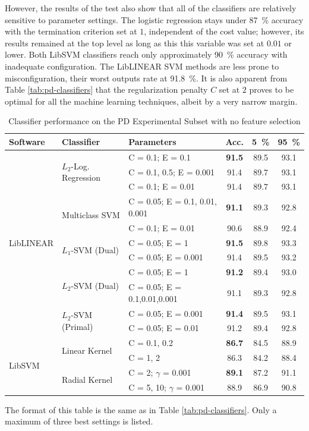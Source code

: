 \documentclass[12pt,notitlepage,a4paper]{report}
\begin{document}
However, the results of the test also show that all of the classifiers are relatively sensitive to parameter settings. The logistic regression stays under 87~\% accuracy with the termination criterion set at $1$, independent of the cost value; however, its results remained at the top level as long as this this variable was set at $0.01$ or lower. Both LibSVM classifiers reach only approximately 90~\% accuracy with inadequate configuration. The LibLINEAR SVM methods are less prone to misconfiguration, their worst outputs rate at 91.8~\%. It is also apparent from Table \ref{tab:pd-classifiers} that the regularization penalty $C$ set at $2$ proves to be optimal for all the machine learning techniques, albeit by a very narrow margin.

\begin{table}[htpb]
\caption{Classifier performance on the PD Experimental Subset with no feature selection}\label{tab:pd-allfeat}\footnotesize
\begin{center}
\shorthandoff{-}
\begin{tabular}{|l|l|l|c|c|c|}\hline
\bf Software & \bf Classifier & \bf Parameters & \bf Acc. & \bf 5~\% & \bf 95~\% \\\hline
\multirow{11}{*}{LibLINEAR} & \multirow{3}{*}{$L_2$-Log. Regression} & C = 0.1; E = 0.1 & \bf 91.5 & 89.5 & 93.1 \\
 & & C = 0.1, 0.5; E = 0.001 & 91.4 & 89.7 & 93.1 \\
 & & C = 0.1; E = 0.01 & 91.4 & 89.7 & 93.1 \\\cline{2-6}
 & \multirow{2}{*}{Multiclass SVM} & C = 0.05; E = 0.1, 0.01, 0.001 & \bf 91.1 & 89.3 & 92.8 \\
 &  & C = 0.1; E = 0.01 & 90.6 & 88.9 & 92.4 \\\cline{2-6}
 & \multirow{2}{*}{$L_1$-SVM (Dual)} & C = 0.05; E = 1 & \bf 91.5 & 89.8 & 93.3 \\
 & & C = 0.05; E = 0.001 & 91.4 & 89.5 & 93.2 \\ \cline{2-6}
 & \multirow{2}{*}{$L_2$-SVM (Dual)} & C = 0.05; E = 1 & \bf 91.2 & 89.4 & 93.0 \\
 &  & C = 0.05; E = 0.1,0.01,0.001 & 91.1 & 89.3 & 92.8 \\\cline{2-6}
 & \multirow{2}{*}{$L_2$-SVM (Primal)} & C = 0.05; E = 0.001 & \bf 91.4 & 89.5 & 93.1 \\
 &  & C = 0.05; E = 0.01 & 91.2 & 89.4 & 92.8  \\\hline
 \multirow{4}{*}{LibSVM} & \multirow{2}{*}{Linear Kernel} & C = 0.1, 0.2 & \bf 86.7 & 84.5 & 88.9  \\
 &  & C = 1, 2 & 86.3 & 84.2 & 88.4 \\\cline{2-6}
 & \multirow{2}{*}{Radial Kernel} & C = 2; $\gamma$ = 0.001 & \bf 89.1 & 87.2 & 91.1 \\
 &  & C = 5, 10; $\gamma$ = 0.001 & 88.9 & 86.9 & 90.8 \\\hline
\end{tabular}
\shorthandon{-}
\end{center}
The format of this table is the same as in Table \ref{tab:pd-classifiers}. Only a maximum of three best settings is listed.
\end{table}
\end{document}
